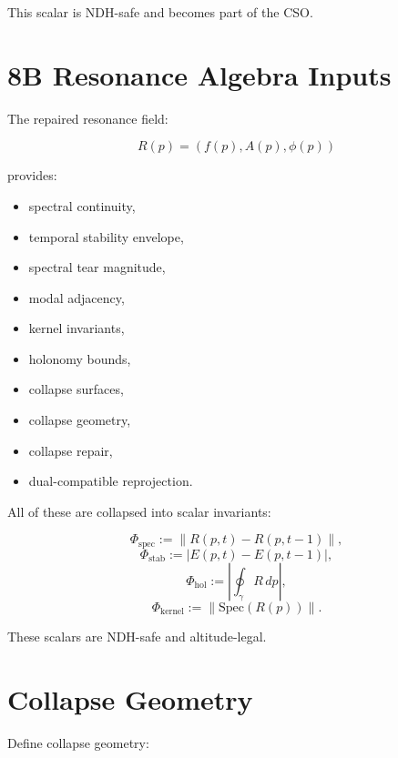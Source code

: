 \documentclass[11pt]{article}
\begin{document}
This scalar is NDH-safe and becomes part of the CSO.

\newpage


\section{8B Resonance Algebra Inputs}

The repaired resonance field:

\[
R(p) = (f(p), A(p), \phi(p))
\]

provides:

\begin{itemize}
  \item spectral continuity,
  \item temporal stability envelope,
  \item spectral tear magnitude,
  \item modal adjacency,
  \item kernel invariants,
  \item holonomy bounds,
  \item collapse surfaces,
  \item collapse geometry,
  \item collapse repair,
  \item dual-compatible reprojection.
\end{itemize}

All of these are collapsed into scalar invariants:

\[
\Phi_{\mathrm{spec}} := \| R(p,t) - R(p,t-1) \|,
\]
\[
\Phi_{\mathrm{stab}} := |E(p,t) - E(p,t-1)|,
\]
\[
\Phi_{\mathrm{hol}} := \left| \oint_\gamma R \, dp \right|,
\]
\[
\Phi_{\mathrm{kernel}} := \| \mathrm{Spec}(R(p)) \|.
\]

These scalars are NDH-safe and altitude-legal.

\newpage


\section{Collapse Geometry}

Define collapse geometry:
\end{document}
